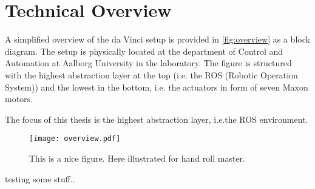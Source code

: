 \section{Technical Overview}
A simplified overview of the da Vinci setup is provided in \autoref{fig:overview} as a block diagram. The setup is physically located at the department of Control and Automation at Aalborg University in the laboratory. The figure is structured with the highest abstraction layer at the top (i.e. the ROS (Robotic Operation System)) and the lowest in the bottom, i.e. the actuators in form of seven Maxon motors.

The focus of this thesis is the highest abstraction layer, i.e.the ROS environment.
\begin{figure}[H]
	\center
	\texttt{[image: overview.pdf]}	\caption{This is a nice figure. Here illustrated for hand roll master.}
	\label{fig:overview}
\end{figure}

testing some stuff..
